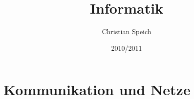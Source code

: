 \documentclass[
			bigheadings,
			ngerman,
			a4paper,
			BCOR5mm,
			DIV11,
			1.1headlines,
			headexclude,
			footerexclude,
			mpeclude,
			pagesize,
			twoside,
			onecolumn,
			openright,
			titelpage,
			parindent,
			nochapterprefix,
			bibtotoc,
			listsindent,
			pointlessnumbers,
			fleqn]{scrbook}
\title{Informatik}
\author{Christian Speich}
\date{2010/2011}                                           %
\begin{document}
\maketitle
\tableofcontents

\part{Kommunikation und Netze}





\end{document}
